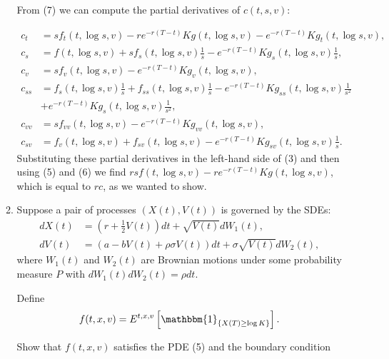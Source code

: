 \documentclass[handout,8pt]{beamer}
\begin{document}
\begin{frame}[allowframebreaks]{ }
\begin{enumerate}
\begin{enumerate}
        \newpage
        
        From (7) we can compute the partial derivatives of $c(t,s,v)$: 
        
        \begin{align*}
            c_t &= sf_t(t,\log s,v) - re^{-r(T-t)}Kg(t,\log s, v) - e^{-r(T-t)}Kg_t(t,\log s, v),\\
            c_s &= f(t,\log s,v) + sf_s(t,\log s,v)\frac{1}{s} - e^{-r(T-t)}Kg_s(t,\log s, v)\frac{1}{s},\\
            c_v &= sf_v(t,\log s,v) - e^{-r(T-t)}Kg_v(t,\log s, v),\\
            c_{ss} &=f_s(t,\log s,v)\frac{1}{s} + f_{ss}(t,\log s,v)\frac{1}{s} - e^{-r(T-t)}Kg_{ss}(t,\log s,v)\frac{1}{s^2} \\
            &+ e^{-r(T-t)}Kg_s(t,\log s,v)\frac{1}{s^2},\\
            c_{vv} &=sf_{vv}(t,\log s,v) - e^{-r(T-t)}Kg_{vv}(t,\log s,v),\\
            c_{sv} &= f_v(t,\log s,v) + f_{sv}(t,\log s,v) - e^{-r(T-t)}Kg_{sv}(t,\log s,v)\frac{1}{s}.
        \end{align*}
        Substituting these partial derivatives in the left-hand side of (3) and then using (5) and (6) we find $r s f(t,\log s,v) - r e^{-r(T-t)} K g(t,\log s,v)$, which is equal to $rc$, as we wanted to show.
        
        \newpage
        \vspace*{1cm}
        
        \item Suppose a pair of processes $(X(t), V(t))$ is governed by the SDEs:
        \begin{align}
            dX(t) &= \left(r + \frac{1}{2}V(t) \right) dt + \sqrt{V(t)} dW_1(t),\\
            dV(t) &= (a - bV(t) + \rho \sigma V(t)) dt + \sigma\sqrt{V(t)} dW_2(t),
        \end{align}
        where $W_1(t)$ and $W_2(t)$ are Brownian motions under some probability measure $P$ with $dW_1(t)dW_2(t) = \rho dt$. \newline 
        
        Define
        \begin{equation*}
            f(t,x,v)=E^{t,x,v}\left[\mathbbm{1}_{\{X(T)\geq \log K\}}\right].
        \end{equation*}
        
        Show that $f(t,x,v)$ satisfies the PDE (5) and the boundary condition
        

\end{enumerate}
\end{enumerate}
\end{frame}
\end{document}
